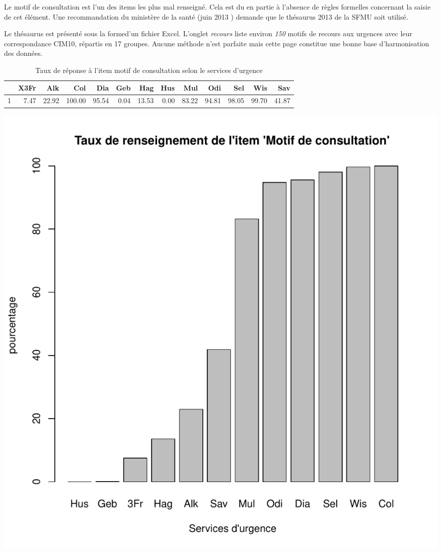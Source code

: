 \documentclass[12pt,english,french,twoside]{report}\usepackage[]{graphicx}\usepackage[]{color}
\makeatletter
\def\maxwidth{ %
  \ifdim\Gin@nat@width>\linewidth
    \linewidth
  \else
    \Gin@nat@width
  \fi
}
\makeatother
\begin{document}
Le motif de consultation est l'un des items les plus mal renseigné. Cela est du en partie à l'absence de règles formelles concernant la saisie de cet élément. Une recommandation du ministère de la santé (juin 2013 \cite{12,13}) demande que le thésaurus 2013 de la SFMU \cite{9} soit utilisé.

Le thésaurus est présenté sous la formed'un fichier Excel. L'onglet \emph{recours} liste environ \emph{150} motifs de recours aux urgences avec leur correspondance CIM10, répartis en 17 groupes. Aucune méthode n'est parfaite mais cette page constitue une bonne base d'harmonisation des données.


\begin{table}[ht]
\centering
\begin{tabular}{rrrrrrrrrrrrr}
  \hline
 & X3Fr & Alk & Col & Dia & Geb & Hag & Hus & Mul & Odi & Sel & Wis & Sav \\ 
  \hline
1 & 7.47 & 22.92 & 100.00 & 95.54 & 0.04 & 13.53 & 0.00 & 83.22 & 94.81 & 98.05 & 99.70 & 41.87 \\ 
   \hline
\end{tabular}
\caption[motif de consultation]{Taux de réponse à l'item motif de consultation selon le services d'urgence} 
\label{lab:motif}
\end{table}

\includegraphics[width=\maxwidth]{figure/motifss1} 
\end{document}
